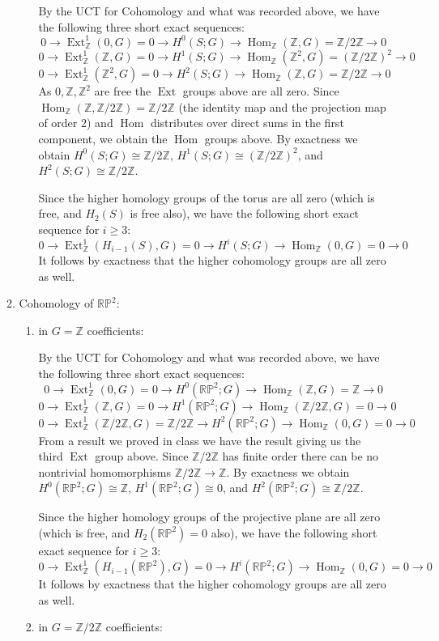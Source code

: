 \documentclass[11pt]{article}
\DeclareMathOperator{\Hom}{Hom}
\DeclareMathOperator{\Ext}{Ext}
\begin{document}
\begin{enumerate}
\begin{enumerate}
\begin{enumerate}
        By the UCT for Cohomology and what was recorded above, we have the following three short exact sequences:
        \[0\to \Ext_\mathbb{Z}^1(0, G)=0\to H^0(S;G)\to \Hom_\mathbb{Z}(\mathbb{Z},G)=\mathbb{Z}/2\mathbb{Z}\to 0\]
        \[0\to \Ext_\mathbb{Z}^1(\mathbb{Z}, G)=0\to H^1(S;G)\to \Hom_\mathbb{Z}(\mathbb{Z}^2,G)=(\mathbb{Z}/2\mathbb{Z})^2\to 0\]
        \[0\to \Ext_\mathbb{Z}^1(\mathbb{Z}^2, G)=0\to H^2(S;G)\to \Hom_\mathbb{Z}(\mathbb{Z},G)=\mathbb{Z}/2\mathbb{Z}\to 0\] 
        As $0,\mathbb{Z},\mathbb{Z}^2$ are free the $\Ext$ groups above are all zero. Since $\Hom_\mathbb{Z}(\mathbb{Z},\mathbb{Z}/2\mathbb{Z}) = \mathbb{Z}/2\mathbb{Z}$ (the identity map and the projection map of order $2$) and $\Hom$ distributes over direct sums in the first component, we obtain the $\Hom$ groups above. By exactness we obtain $H^0(S;G)\cong\mathbb{Z}/2\mathbb{Z}$, $H^1(S;G)\cong(\mathbb{Z}/2\mathbb{Z})^2$, and $H^2(S;G)\cong\mathbb{Z}/2\mathbb{Z}$.

        Since the higher homology groups of the torus are all zero (which is free, and $H_2(S)$ is free also), we have the following short exact sequence for $i\geq 3$: \[0\to \Ext_\mathbb{Z}^1(H_{i-1}(S), G)=0\to H^i(S;G)\to \Hom_\mathbb{Z}(0,G)=0\to 0\] It follows by exactness that the higher cohomology groups are all zero as well.
      \end{enumerate}
      \item Cohomology of $\mathbb{RP}^2$:\begin{enumerate}
        \item in $G=\mathbb{Z}$ coefficients:
        
        By the UCT for Cohomology and what was recorded above, we have the following three short exact sequences:
        \[0\to \Ext_\mathbb{Z}^1(0, G)=0\to H^0(\mathbb{RP}^2;G)\to \Hom_\mathbb{Z}(\mathbb{Z},G)=\mathbb{Z}\to 0\]
        \[0\to \Ext_\mathbb{Z}^1(\mathbb{Z}, G)=0\to H^1(\mathbb{RP}^2;G)\to \Hom_\mathbb{Z}(\mathbb{Z}/2\mathbb{Z},G)=0\to 0\]
        \[0\to \Ext_\mathbb{Z}^1(\mathbb{Z}/2\mathbb{Z}, G)=\mathbb{Z}/2\mathbb{Z}\to H^2(\mathbb{RP}^2;G)\to \Hom_\mathbb{Z}(0,G)=0\to 0\] 
        From a result we proved in class we have the result giving us the third $\Ext$ group above. Since $\mathbb{Z}/2\mathbb{Z}$ has finite order there can be no nontrivial homomorphisms $\mathbb{Z}/2\mathbb{Z}\to \mathbb{Z}$. By exactness we obtain $H^0(\mathbb{RP}^2;G)\cong\mathbb{Z}$, $H^1(\mathbb{RP}^2;G)\cong 0$, and $H^2(\mathbb{RP}^2;G)\cong\mathbb{Z}/2\mathbb{Z}$.

        Since the higher homology groups of the projective plane are all zero (which is free, and $H_2(\mathbb{RP}^2)=0$ also), we have the following short exact sequence for $i\geq 3$: \[0\to \Ext_\mathbb{Z}^1(H_{i-1}(\mathbb{RP}^2), G)=0\to H^i(\mathbb{RP}^2;G)\to \Hom_\mathbb{Z}(0,G)=0\to 0\] It follows by exactness that the higher cohomology groups are all zero as well.
        \item in $G=\mathbb{Z}/2\mathbb{Z}$ coefficients:
        

\end{enumerate}
\end{enumerate}
\end{enumerate}
\end{document}
